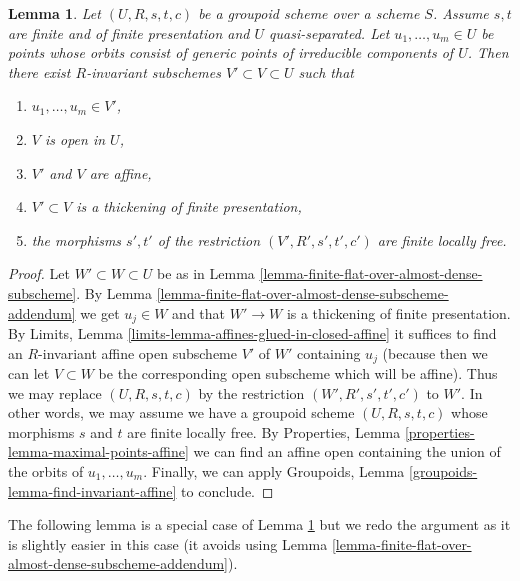\documentclass[10pt,a4paper]{amsart}
\theoremstyle{plain}
\newtheorem{lemma}[subsection]{Lemma}
\theoremstyle{definition}
\theoremstyle{remark}
\numberwithin{equation}{subsection}
\begin{document}
\begin{lemma}
\label{lemma-invariant-affine-open-around-generic-point}
Let $(U, R, s, t, c)$ be a groupoid scheme over a scheme $S$. Assume $s, t$
are finite and of finite presentation and $U$ quasi-separated. Let
$u_1, \ldots, u_m \in U$ be points whose orbits consist of generic points
of irreducible components of $U$. Then there exist $R$-invariant subschemes
$V' \subset V \subset U$ such that
\begin{enumerate}
\item $u_1, \ldots, u_m \in V'$,
\item $V$ is open in $U$,
\item $V'$ and $V$ are affine,
\item $V' \subset V$ is a thickening of finite presentation,
\item the morphisms $s', t'$ of the restriction $(V', R', s', t', c')$
are finite locally free.
\end{enumerate}
\end{lemma}

\begin{proof}
Let $W' \subset W \subset U$ be as in
Lemma \ref{lemma-finite-flat-over-almost-dense-subscheme}.
By Lemma \ref{lemma-finite-flat-over-almost-dense-subscheme-addendum}
we get $u_j \in W$ and that $W' \to W$ is a thickening of finite presentation.
By Limits, Lemma \ref{limits-lemma-affines-glued-in-closed-affine}
it suffices to find an $R$-invariant affine open subscheme
$V'$ of $W'$ containing $u_j$ (because then we can let $V \subset W$
be the corresponding open subscheme which will be affine).
Thus we may replace $(U, R, s, t, c)$ by the restriction
$(W', R', s', t', c')$ to $W'$.
In other words, we may assume we have a groupoid scheme $(U, R, s, t, c)$
whose morphisms $s$ and $t$ are finite locally free.
By Properties, Lemma \ref{properties-lemma-maximal-points-affine}
we can find an affine open containing the union of the orbits of
$u_1, \ldots, u_m$. Finally, we can apply
Groupoids, Lemma \ref{groupoids-lemma-find-invariant-affine}
to conclude.
\end{proof}

\noindent
The following lemma is a special case of
Lemma \ref{lemma-invariant-affine-open-around-generic-point}
but we redo the argument as it is slightly easier in this case
(it avoids using
Lemma \ref{lemma-finite-flat-over-almost-dense-subscheme-addendum}).
\end{document}
